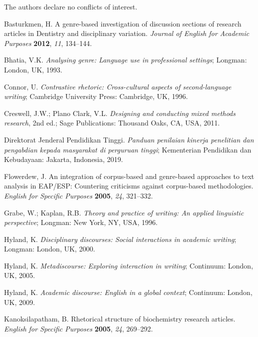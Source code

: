 \documentclass[journal,article,submit,pdftex,moreauthors]{Definitions/mdpi}
\begin{document}
The authors declare no conflicts of interest.



\begin{thebibliography}{999}
 Basturkmen, H. A genre-based investigation of discussion sections of research articles in Dentistry and disciplinary variation. \textit{Journal of English for Academic Purposes} \textbf{2012}, \textit{11}, 134--144.

 Bhatia, V.K. \textit{Analysing genre: Language use in professional settings}; Longman: London, UK, 1993.

 Connor, U. \textit{Contrastive rhetoric: Cross-cultural aspects of second-language writing}; Cambridge University Press: Cambridge, UK, 1996.

 Creswell, J.W.; Plano Clark, V.L. \textit{Designing and conducting mixed methods research}, 2nd ed.; Sage Publications: Thousand Oaks, CA, USA, 2011.

 Direktorat Jenderal Pendidikan Tinggi. \textit{Panduan penilaian kinerja penelitian dan pengabdian kepada masyarakat di perguruan tinggi}; Kementerian Pendidikan dan Kebudayaan: Jakarta, Indonesia, 2019.

 Flowerdew, J. An integration of corpus-based and genre-based approaches to text analysis in EAP/ESP: Countering criticisms against corpus-based methodologies. \textit{English for Specific Purposes} \textbf{2005}, \textit{24}, 321--332.

 Grabe, W.; Kaplan, R.B. \textit{Theory and practice of writing: An applied linguistic perspective}; Longman: New York, NY, USA, 1996.

 Hyland, K. \textit{Disciplinary discourses: Social interactions in academic writing}; Longman: London, UK, 2000.

 Hyland, K. \textit{Metadiscourse: Exploring interaction in writing}; Continuum: London, UK, 2005.

 Hyland, K. \textit{Academic discourse: English in a global context}; Continuum: London, UK, 2009.

 Kanoksilapatham, B. Rhetorical structure of biochemistry research articles. \textit{English for Specific Purposes} \textbf{2005}, \textit{24}, 269--292.


\end{thebibliography}
\end{document}
